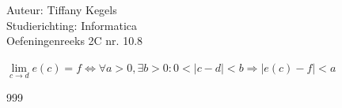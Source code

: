 \documentclass[a4paper]{article}
\begin{document}
  
\noindent \large Auteur: Tiffany Kegels \\
\noindent \large Studierichting: Informatica\\
\noindent \large Oefeningenreeks 2C nr. 10.8\\

\medskip

\normalsize

$\lim\limits_{c \rightarrow d} e(c) =  f \Leftrightarrow \forall a > 0, \exists b> 0 : 0 < |c-d| < b \Rightarrow |e(c) - f| < a$\\


\begin{thebibliography}{999}

\end{thebibliography}
\end{document}
